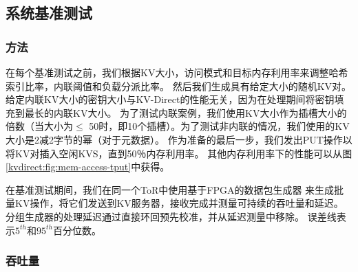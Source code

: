 \subsection{系统基准测试}
\label{kvdirect:sec:system-benchmark}

\subsubsection{方法}

在每个基准测试之前，我们根据KV大小，访问模式和目标内存利用率来调整哈希索引比率，内联阈值和负载分派比率。
然后我们生成具有给定大小的随机KV对。
给定内联KV大小的密钥大小与KV-Direct的性能无关，因为在处理期间将密钥填充到最长的内联KV大小。
为了测试内联案例，我们使用KV大小作为插槽大小的倍数（当大小为$ \leq $ 50时，即10个插槽）。为了测试非内联的情况，我们使用的KV大小是2减2字节的幂（对于元数据）。
作为准备的最后一步，我们发出PUT操作以将KV对插入空闲KVS，直到50％内存利用率。
其他内存利用率下的性能可以从图 \ref {kvdirect:fig:mem-access-tput}中获得。

在基准测试期间，我们在同一个ToR中使用基于FPGA的数据包生成器 \cite {li2016clicknp}来生成批量KV操作，将它们发送到KV服务器，接收完成并测量可持续的吞吐量和延迟。
分组生成器的处理延迟通过直接环回预先校准，并从延迟测量中移除。
误差线表示$ 5^{th} $和$ 95^{th} $百分位数。

\subsubsection{吞吐量}

